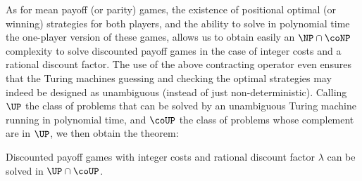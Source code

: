As for mean payoff (or parity) games, the existence of positional
optimal (or winning) strategies for both players, and the ability to
solve in polynomial time the one-player version of these games, allows
us to obtain easily an $\NP\cap\coNP$ complexity to solve
discounted payoff games in the case of integer costs and a rational
discount factor. The use of the above contracting operator even
ensures that the Turing machines guessing and checking the optimal
strategies may indeed be designed as unambiguous (instead of just
non-deterministic). Calling $\UP$ the class of problems that can be
solved by an unambiguous Turing machine running in polynomial time,
and $\coUP$ the class of problems whose complement are in $\UP$, we
then obtain the theorem:
\begin{theorem}[Complexity]\label{4-thm:disc-up}
  Discounted payoff games with integer costs and rational discount
  factor $\lambda$ can be solved in $\UP\cap\coUP$.
\end{theorem}

